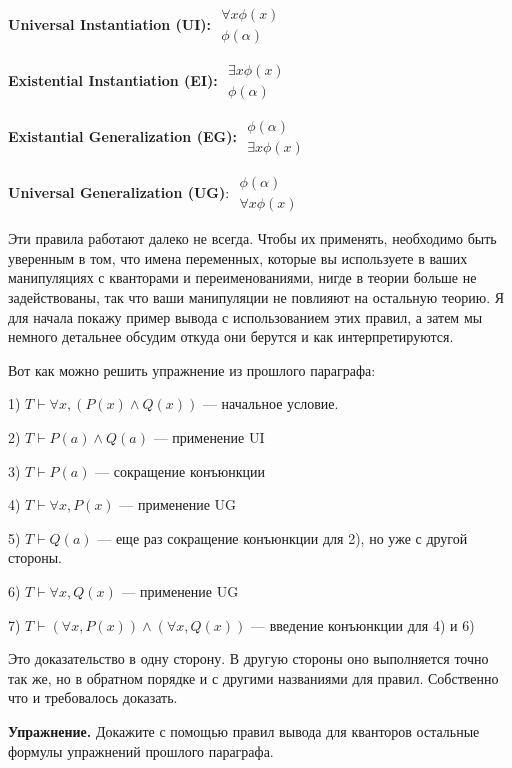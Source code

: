{\bfseries Universal Instantiation (UI):} $\begin{array}{l}\forall x\phi(x)\\ \hline\phi(\alpha)\end{array}$

{\bfseries Existential Instantiation (EI):} $\begin{array}{l}\exists x\phi(x)\\ \hline\phi(\alpha)\end{array}$

{\bfseries Existantial Generalization (EG):} $\begin{array}{l}\phi(\alpha)\\ \hline\exists x\phi(x)\end{array}$

{\bfseries Universal Generalization (UG)}: $\begin{array}{l}\phi(\alpha)\\ \hline\forall x\phi(x)\end{array}$

Эти правила работают далеко не всегда. Чтобы их применять, необходимо быть уверенным в том, что имена переменных, которые вы используете в ваших манипуляциях с кванторами и переименованиями, нигде в теории больше не задействованы, так что ваши манипуляции не повлияют на остальную теорию. Я для начала покажу пример вывода с использованием этих правил, а затем мы немного детальнее обсудим откуда они берутся и как интерпретируются.

Вот как можно решить упражнение из прошлого параграфа:

1) $T\vdash\forall x, (P(x)\wedge Q(x))$ — начальное условие.

2) $T\vdash P(a)\wedge Q(a)$ — применение UI

3) $T\vdash P(a)$ — сокращение конъюнкции

4) $T\vdash\forall x, P(x)$ — применение UG

5) $T\vdash Q(a)$ — еще раз сокращение конъюнкции для 2), но уже с другой стороны.

6) $T\vdash \forall x, Q(x)$ — применение UG

7) $T\vdash (\forall x, P(x)) \wedge (\forall x, Q(x))$ — введение конъюнкции для 4) и 6)

Это доказательство в одну сторону. В другую стороны оно выполняется точно так же, но в обратном порядке и с другими названиями для правил. Собственно что и требовалось доказать.

{\bfseries Упражнение.} Докажите с помощью правил вывода для кванторов остальные формулы упражнений прошлого параграфа.


